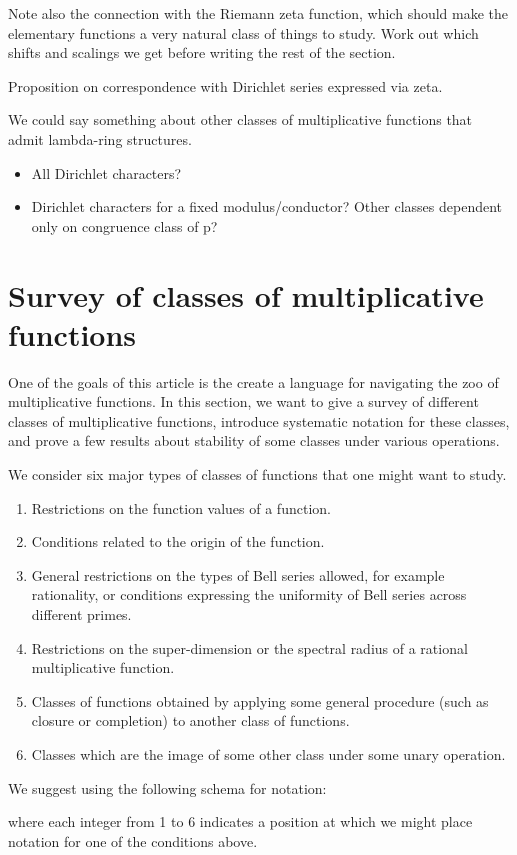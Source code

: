 \documentclass[a4paper]{article}
\theoremstyle{definition}
\theoremstyle{remark}
\begin{document}
Note also the connection with the Riemann zeta function, which should make the elementary functions a very natural class of things to study. Work out which shifts and scalings we get before writing the rest of the section.




Proposition on correspondence with Dirichlet series expressed via zeta.

We could say something about other classes of multiplicative functions that admit lambda-ring structures.  
\begin{itemize}
\item All Dirichlet characters?
\item Dirichlet characters for a fixed modulus/conductor? Other classes dependent only on congruence class of p?
\end{itemize}




\section{Survey of classes of multiplicative functions}

One of the goals of this article is the create a language for navigating the zoo of multiplicative functions. In this section, we want to give a survey of different classes of multiplicative functions, introduce systematic notation for these classes, and prove a few results about stability of some classes under various operations.

We consider six major types of classes of functions that one might want to study.

\begin{enumerate}
\item Restrictions on the function values of a function.
\item Conditions related to the origin of the function.
\item General restrictions on the types of Bell series allowed, for example rationality, or conditions expressing the uniformity of Bell series across different primes.
\item Restrictions on the super-dimension or the spectral radius of a rational multiplicative function.
\item Classes of functions obtained by applying some general procedure (such as closure or completion) to another class of functions.
\item Classes which are the image of some other class under some unary operation.
\end{enumerate}
We suggest using the following schema for notation:
\begin{center}
\end{center}
where each integer from 1 to 6 indicates a position at which we might place notation for one of the conditions above. 
\end{document}
